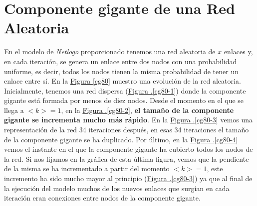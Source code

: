 \documentclass[10pt,a4paper,spanish]{article}
\numberwithin{equation}{section} %
\numberwithin{figure}{section} %
\numberwithin{table}{section} %
\theoremstyle{plain}
\theoremstyle{definition}
\begin{document}
\section{Componente gigante de una Red Aleatoria}
En el modelo de \textit{Netlogo} proporcionado tenemos una red aleatoria de $x$ enlaces y, en cada iteración, se genera un enlace entre dos nodos con una probabilidad uniforme, es decir, todos los nodos tienen la misma probabilidad de tener un enlace entre sí. En la \hyperref[cg80]{Figura \ref*{cg80}} muestro una evolución de la red aleatoria. Inicialmente, tenemos una red dispersa (\hyperref[cg80-1]{Figura \thesection .\ref*{cg80-1}}) donde la componente gigante está formada por menos de diez nodos. Desde el momento en el que se llega a $<k>=1$, en la \hyperref[cg80-2]{Figura \thesection .\ref*{cg80-2}}, \textbf{el tamaño de la componente gigante se incrementa mucho más rápido}. En la \hyperref[cg80-3]{Figura \thesection .\ref*{cg80-3}} vemos una representación de la red 34 iteraciones después, en esas 34 iteraciones el tamaño de la componente gigante se ha duplicado. Por último, en la \hyperref[cg80-4]{Figura \thesection .\ref*{cg80-4}} vemos el instante en el que la componente gigante ha cubierto todos los nodos de la red. Si nos fijamos en la gráfica de esta última figura, vemos que la pendiente de la misma se ha incrementado a partir del momento $<k>=1$, este incremento ha sido mucho mayor al principio (\hyperref[cg80-3]{Figura \thesection .\ref*{cg80-3}}) ya que al final de la ejecución del modelo muchos de los nuevos enlaces que surgían en cada iteración eran conexiones entre nodos de la componente gigante.
\end{document}
